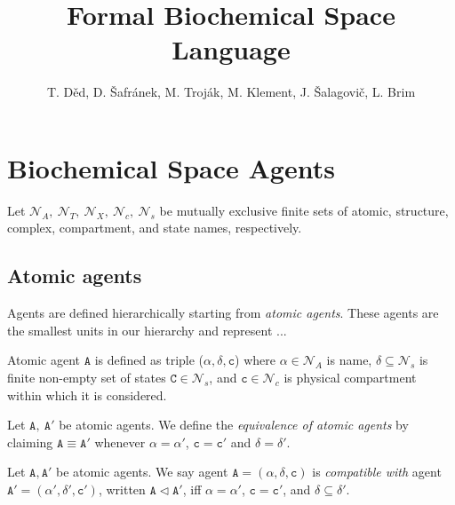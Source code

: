 \documentclass{entcs}
\renewcommand{\~}[0]{\texttildelow}
\begin{document}
\begin{frontmatter}
\title{Formal Biochemical Space Language}

\author{\normalsize
T. D\v{e}d, D. \v{S}afr\'anek, M. Troj\'ak, M. Klement, J. \v{S}alagovi\v{c}, L. Brim}
\address{Faculty of Informatics, Masaryk University\\
Brno, Czech Republic
}

\end{frontmatter}

\section{Biochemical Space Agents}

Let $\mathcal{N}_{A},~\mathcal{N}_{T},~\mathcal{N}_{X},~\mathcal{N}_{c},~\mathcal{N}_{s}$ be mutually exclusive finite sets of atomic, structure, complex, compartment, and state names, respectively. 

\subsection{Atomic agents}

Agents are defined hierarchically starting from \emph{atomic agents}. These agents are the smallest units in our hierarchy and represent ...

\begin{defn}
Atomic agent $\mathtt{A}$ is defined as triple ($\alpha, \delta, \mathtt{c}$) where $\alpha \in \mathcal{N}_{A}$ is name, $\delta \subseteq \mathcal{N}_{s}$ is finite non-empty set of states $\mathtt{C} \in \mathcal{N}_{s}$, and $\mathtt{c} \in \mathcal{N}_{c}$ is physical compartment within which it is considered.
\end{defn}

\begin{defn}
Let $\mathtt{A},~\mathtt{A}'$ be atomic agents. We define the \emph{equivalence of atomic agents} by claiming $\mathtt{A}\equiv\mathtt{A}'$ whenever $\mathtt{\alpha} = \mathtt{\alpha}'$, $\mathtt{c} = \mathtt{c}'$ and $\delta = \delta'$.
\end{defn}

\begin{defn}
Let $\mathtt{A},\mathtt{A}'$ be atomic agents. We say agent $\mathtt{A}=(\alpha, \delta, \mathtt{c})$ is \emph{compatible with} agent $\mathtt{A}'=(\alpha', \delta', \mathtt{c}')$, written $\mathtt{A} \lhd \mathtt{A}'$, iff $\alpha = \alpha'$, $\mathtt{c} = \mathtt{c}'$, and $\delta \subseteq \delta'$. 
\end{defn}
\end{document}
